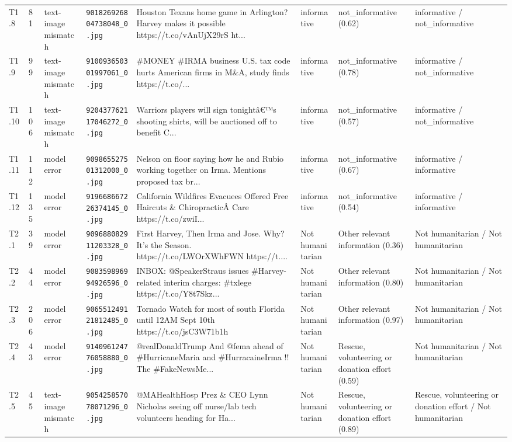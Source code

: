 \begin{table}[t]
\begin{tabular}{llllp{4.4cm}p{2.1cm}p{2.5cm}p{2.3cm}}
T1.8 & 81 & text-image mismatch & \texttt{901826926804738048\_0.jpg} & Houston Texans home game in Arlington? Harvey makes it possible https://t.co/vAnUjX29rS ht... & informative & not\_informative (0.62) & informative / not\_informative \\
T1.9 & 99 & text-image mismatch & \texttt{910093650301997061\_0.jpg} & \#MONEY \#IRMA business U.S. tax code hurts American firms in M\&A, study finds https://t.co/... & informative & not\_informative (0.78) & informative / not\_informative \\
T1.10 & 106 & text-image mismatch & \texttt{920437762117046272\_0.jpg} & Warriors players will sign tonightâ€™s shooting shirts, will be auctioned off to benefit C... & informative & not\_informative (0.57) & informative / not\_informative \\
T1.11 & 112 & model error & \texttt{909865527501312000\_0.jpg} & Nelson on floor saying how he and Rubio working together on Irma. Mentions proposed tax br... & informative & not\_informative (0.67) & informative / informative \\
T1.12 & 135 & model error & \texttt{919668667226374145\_0.jpg} & California Wildfires Evacuees Offered Free Haircuts \& ChiropracticÂ Care https://t.co/zwiI... & informative & not\_informative (0.54) & informative / informative \\
T2.1 & 39 & model error & \texttt{909688082911203328\_0.jpg} & First Harvey, Then Irma and Jose. Why? It’s the Season. https://t.co/LWOrXWhFWN https://t.... & Not humanitarian & Other relevant information (0.36) & Not humanitarian / Not humanitarian \\
T2.2 & 44 & model error & \texttt{908359896994926596\_0.jpg} & INBOX: @SpeakerStraus issues \#Harvey-related interim charges: \#txlege https://t.co/Y8t7Skz... & Not humanitarian & Other relevant information (0.80) & Not humanitarian / Not humanitarian \\
T2.3 & 206 & model error & \texttt{906551249121812485\_0.jpg} & Tornado Watch for most of south Florida until 12AM Sept 10th https://t.co/jsC3W71b1h & Not humanitarian & Other relevant information (0.97) & Not humanitarian / Not humanitarian \\
T2.4 & 43 & model error & \texttt{914096124776058880\_0.jpg} & @realDonaldTrump And @fema ahead of \#HurricaneMaria and \#HurracaineIrma !! The \#FakeNewsMe... & Not humanitarian & Rescue, volunteering or donation effort (0.59) & Not humanitarian / Not humanitarian \\
T2.5 & 45 & text-image mismatch & \texttt{905425857078071296\_0.jpg} & @MAHealthHosp Prez \& CEO Lynn Nicholas seeing off nurse/lab tech volunteers heading for Ha... & Not humanitarian & Rescue, volunteering or donation effort (0.89) & Rescue, volunteering or donation effort / Not humanitarian \\

\end{tabular}
\end{table}
